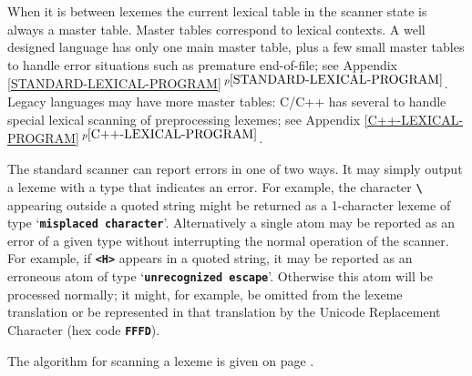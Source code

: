 \documentclass[12pt]{article}
\newcommand{\TT}[1]{{\tt \bfseries #1}}
\newcommand{\itemref}[1]{\ref{#1}$\,^{p\pageref{#1}}$}
\begin{document}
When it is between lexemes the current lexical table in the scanner state
is always a master table.  Master tables correspond to lexical
contexts.  A well designed language has only one main master
table, plus a few small master tables to handle error situations
such as premature end-of-file;
see Appendix \itemref{STANDARD-LEXICAL-PROGRAM}.
Legacy languages
may have more master tables: C/C++ has several to handle
special lexical scanning of preprocessing lexemes;
see Appendix \itemref{C++-LEXICAL-PROGRAM}.

The standard scanner can report errors in one of two ways.  It may
simply output a lexeme with a type that indicates an error.  For
example, the character \TT{\textbackslash} appearing outside a quoted string
might be returned as a 1-character lexeme of type `\TT{misplaced
character}'.  Alternatively a single atom may be reported as an
error of a given type without interrupting the normal operation
of the scanner.  For example, if \TT{<H>} appears in a quoted
string, it may be reported as an erroneous atom of type
`\TT{unrecognized escape}'.  Otherwise this atom will be processed
normally; it might, for example, be omitted from the lexeme
translation or be represented in that translation by the Unicode
Replacement Character (hex code \TT{FFFD}).

The algorithm for scanning a lexeme is given on page
\pageref{LEXICAL-SCANNING-ALGORITHM}.
\end{document}
